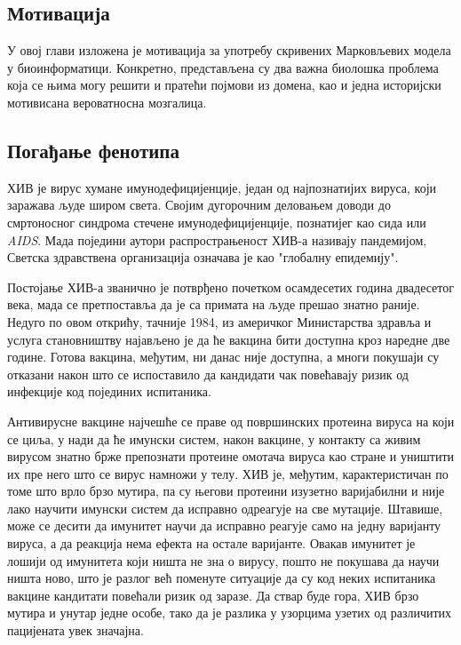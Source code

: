 \documentclass[12pt,oneside]{memoir}
\begin{document}
\begin{CJK}{UTF8}{ipxm}
\chapter{Мотивација}
У овој глави изложена је мотивација за употребу скривених Марковљевих модела у биоинформатици. Конкретно, представљена су два важна биолошка проблема која се њима могу решити и пратећи појмови из домена, као и једна историјски мотивисана вероватносна мозгалица.

\section{Погађање фенотипа}
ХИВ је вирус хумане имунодефицијенције, један од најпознатијих вируса, који заражава људе широм света. Својим дугорочним деловањем доводи до смртоносног синдрома стечене имунодефицијенције, познатијег као сида или \textit{AIDS}. Мада поједини аутори распрострањеност ХИВ-а називају пандемијом, Светска здравствена организација означава је као "глобалну епидемију"\cite{who}.

Постојање ХИВ-а званично је потврђено почетком осамдесетих година двадесетог века, мада се претпоставља да је са примата на људе прешао знатно раније. Недуго по овом открићу, тачније 1984, из америчког Министарства здравља и услуга становништву најављено је да ће вакцина бити доступна кроз наредне две године. Готова вакцина, међутим, ни данас није доступна, а многи покушаји су отказани након што се испоставило да кандидати чак повећавају ризик од инфекције код појединих испитаника.

Антивирусне вакцине најчешће се праве од површинских протеина вируса на који се циља, у нади да ће имунски систем, након вакцине, у контакту са живим вирусом знатно брже препознати протеине омотача вируса као стране и уништити их пре него што се вирус намножи у телу. ХИВ је, међутим, карактеристичан по томе што врло брзо мутира, па су његови протеини изузетно варијабилни и није лако научити имунски систем да исправно одреагује на све мутације. Штавише, може се десити да имунитет научи да исправно реагује само на једну варијанту вируса, а да реакција нема ефекта на остале варијанте. Овакав имунитет је лошији од имунитета који ништа не зна о вирусу, пошто не покушава да научи ништа ново, што је разлог већ поменуте ситуације да су код неких испитаника вакцине кандитати повећали ризик од заразе. Да ствар буде гора, ХИВ брзо мутира и унутар једне особе, тако да је разлика у узорцима узетих од различитих пацијената увек значајна.


\end{CJK}
\end{document}
